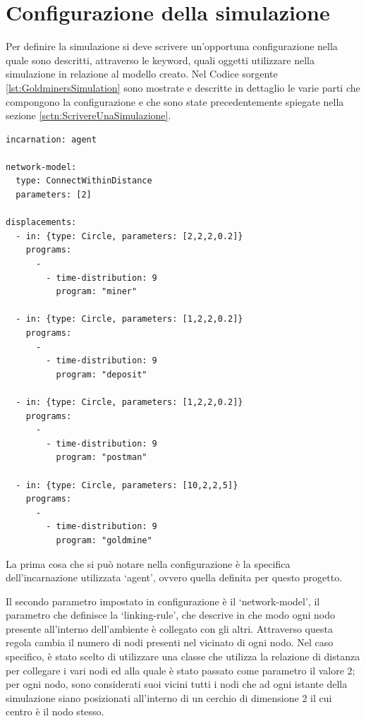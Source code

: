 \section{Configurazione della simulazione}
Per definire la simulazione si deve scrivere un'opportuna configurazione nella quale sono descritti, attraverso le keyword, quali oggetti utilizzare nella simulazione in relazione al modello creato. Nel Codice sorgente \ref{lst:GoldminersSimulation} sono mostrate e descritte in dettaglio le varie parti che compongono la configurazione e che sono state precedentemente spiegate nella sezione \ref{sctn:ScrivereUnaSimulazione}.

\switchToProlog{}
\begin{lstlisting}[float,firstnumber=1,label={lst:GoldminersSimulation},caption={Configurazione simulazione Goldminers}]
incarnation: agent

network-model:
  type: ConnectWithinDistance
  parameters: [2]

displacements:
  - in: {type: Circle, parameters: [2,2,2,0.2]}
    programs:
      -
        - time-distribution: 9
          program: "miner"

  - in: {type: Circle, parameters: [1,2,2,0.2]}
    programs:
      -
        - time-distribution: 9
          program: "deposit"

  - in: {type: Circle, parameters: [1,2,2,0.2]}
    programs:
      -
        - time-distribution: 9
          program: "postman"

  - in: {type: Circle, parameters: [10,2,2,5]}
    programs:
      -
        - time-distribution: 9
          program: "goldmine"
\end{lstlisting}

La prima cosa che si può notare nella configurazione è la specifica dell'incarnazione utilizzata `agent', ovvero quella definita per questo progetto.

Il secondo parametro impostato in configurazione è il `network-model', il parametro che definisce la `linking-rule', che descrive in che modo ogni nodo presente all'interno dell'ambiente è collegato con gli altri. Attraverso questa regola cambia il numero di nodi presenti nel vicinato di ogni nodo. Nel caso specifico, è stato scelto di utilizzare una classe che utilizza la relazione di distanza per collegare i vari nodi ed alla quale è stato passato come parametro il valore 2; per ogni nodo, sono considerati suoi vicini tutti i nodi che ad ogni istante della simulazione siano posizionati all'interno di un cerchio di dimensione 2 il cui centro è il nodo stesso.

